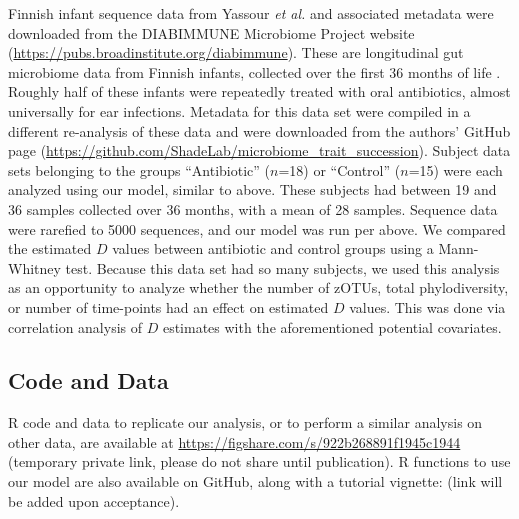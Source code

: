 \documentclass{article}
\begin{document}
\par
Finnish infant sequence data from Yassour \emph{et al.} \cite{Yassour2016} and associated metadata were downloaded from the DIABIMMUNE Microbiome Project website (\url{https://pubs.broadinstitute.org/diabimmune}). These are longitudinal gut microbiome data from Finnish infants, collected over the first 36 months of life \cite{Yassour2016}. Roughly half of these infants were repeatedly treated with oral antibiotics, almost universally for ear infections. Metadata for this data set were compiled in a different re-analysis of these data \cite{Guittar2019} and were downloaded from the authors’ GitHub page (\url{https://github.com/ShadeLab/microbiome_trait_succession}). Subject data sets belonging to the groups “Antibiotic” (\(n\)=18) or “Control” (\(n\)=15) were each analyzed using our model, similar to above. These subjects had between 19 and 36 samples collected over 36 months, with a mean of 28 samples. Sequence data were rarefied to 5000 sequences, and our model was run per above. We compared the estimated \(D\) values between antibiotic and control groups using a Mann-Whitney test. Because this data set had so many subjects, we used this analysis as an opportunity to analyze whether the number of zOTUs, total phylodiversity, or number of time-points had an effect on estimated \(D\) values. This was done via correlation analysis of \(D\) estimates with the aforementioned potential covariates.

\subsection{Code and Data} \label{sec:codeAndData}
R code and data to replicate our analysis, or to perform a similar analysis on other data, are available at \url{https://figshare.com/s/922b268891f1945c1944} (temporary private link, please do not share until publication). R functions to use our model are also available on GitHub, along with a tutorial vignette: (link will be added upon acceptance).


\end{document}
